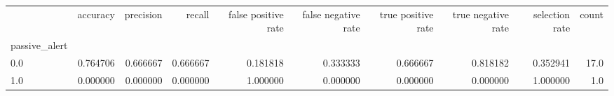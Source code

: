\begin{tabular}{lrrrrrrrrr}
\toprule
{} &  accuracy &  precision &    recall &  false positive rate &  false negative rate &  true positive rate &  true negative rate &  selection rate &  count \\
passive\_alert &           &            &           &                      &                      &                     &                     &                 &        \\
\midrule
0.0           &  0.764706 &   0.666667 &  0.666667 &             0.181818 &             0.333333 &            0.666667 &            0.818182 &        0.352941 &   17.0 \\
1.0           &  0.000000 &   0.000000 &  0.000000 &             1.000000 &             0.000000 &            0.000000 &            0.000000 &        1.000000 &    1.0 \\
\bottomrule
\end{tabular}
